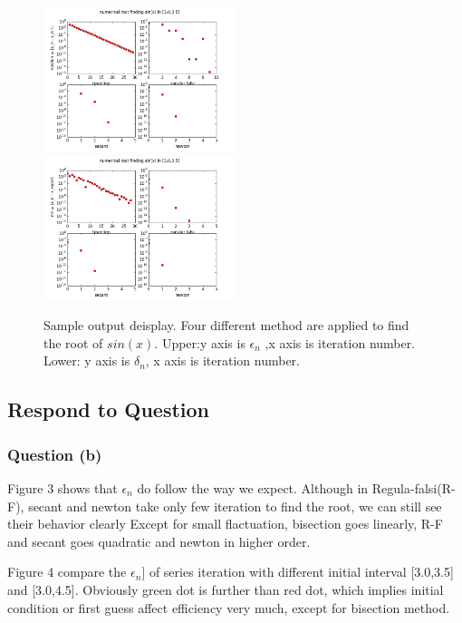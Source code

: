 \documentclass[12pt]{article}
\begin{document}
\begin{figure}[h]
	\begin{center}
		\includegraphics[width=0.5\textwidth]{eps_sin.png}
		\includegraphics[width=0.5\textwidth]{err_sin.png}
		\caption{Sample output deisplay. Four different method are applied to find the root of $sin(x)$.
			Upper:y axis is $\epsilon_{n}$ ,x axis is iteration number. Lower: y axis is $\delta_{n}$, x axis is iteration number. }
		\label{fig3}
		
	\end{center}
\end{figure}

\subsection{Respond to Question}
\subsubsection{Question (b)}
	Figure 3 shows that $\epsilon_{n}$ do follow the way we expect. Although in Regula-falsi(R-F), secant and newton take only few iteration to find the root, we can still see their behavior clearly Except for small flactuation, bisection goes linearly, R-F and secant goes quadratic and newton in higher order. 
	
	Figure 4 compare the $\epsilon_{n}]$ of series iteration with different initial interval [3.0,3.5] and [3.0,4.5]. Obviously green dot is further than red dot, which implies initial condition or first guess affect efficiency very much, except for bisection method.
\end{document}
